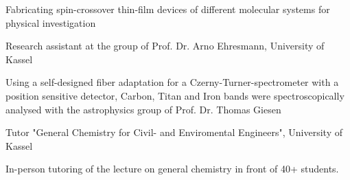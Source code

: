 \begin{minipage}[t]{0.70\textwidth}
\begin{tightemize}
Fabricating spin-crossover thin-film devices of different molecular systems for physical investigation   
\end{tightemize}
\begin{tightemize}
\item Research assistant at the group of Prof. Dr. Arno Ehresmann, University of Kassel

Using a self-designed fiber adaptation for a Czerny-Turner-spectrometer with a position sensitive detector, Carbon, Titan and Iron bands were spectroscopically analysed with the astrophysics group of Prof. Dr. Thomas Giesen
\end{tightemize}
\begin{tightemize}
\item Tutor "General Chemistry for Civil- and Enviromental Engineers", University of Kassel

In-person tutoring of the lecture on general chemistry in front of 40+ students.
\end{tightemize}
\vspace{\topsep} %


%
%
\end{minipage} 
\hfill
